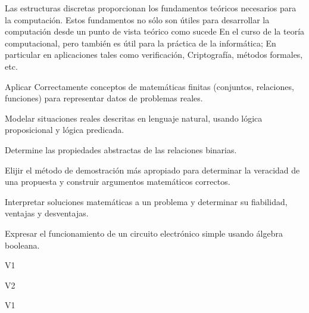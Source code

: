 \begin{syllabus}


\begin{justification}

Las estructuras discretas proporcionan los fundamentos teóricos necesarios para la computación. Estos fundamentos no sólo son útiles para desarrollar la computación desde un punto de vista teórico como sucede
En el curso de la teoría computacional, pero también es útil para la práctica de la informática; En particular en aplicaciones tales como verificación,
Criptografía, métodos formales, etc.

\end{justification}

\begin{goals}
\item Aplicar Correctamente conceptos de matemáticas finitas (conjuntos, relaciones, funciones) para representar datos de problemas reales.
\item Modelar situaciones reales descritas en lenguaje natural, usando lógica proposicional y lógica predicada.
\item Determine las propiedades abstractas de las relaciones binarias.
\item Elijir el método de demostración más apropiado para determinar la veracidad de una propuesta y construir argumentos matemáticos correctos.
\item Interpretar soluciones matemáticas a un problema y determinar su fiabilidad, ventajas y desventajas.
\item Expresar el funcionamiento de un circuito electrónico simple usando álgebra booleana.
\end{goals}

\begin{outcomes}{V1}
    \item {}
    \item {}
\end{outcomes}

\begin{outcomes}{V2}
    \item {}
    \item {}
\end{outcomes}

\begin{competences}{V1}
    \item {}
    \item {}
\end{competences}


\end{syllabus}
